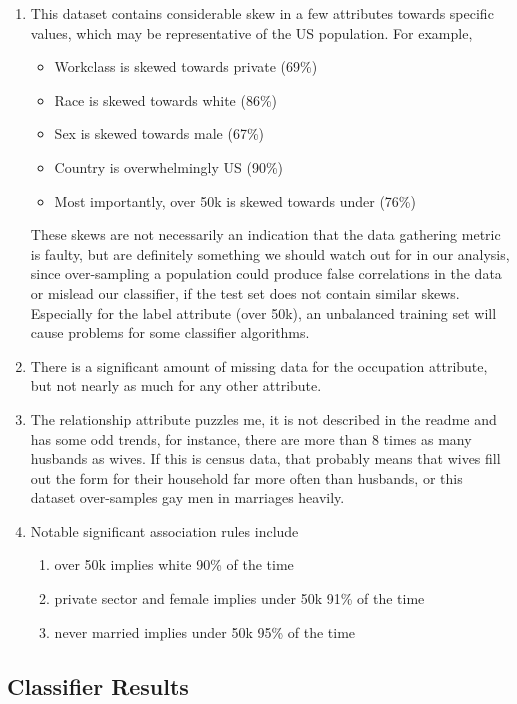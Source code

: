 \documentclass[twoside,12pt]{article}
\begin{document}
\begin{enumerate}
\item This dataset contains considerable skew in a few attributes towards specific values, which may be representative of the US population. For example, 
\begin{itemize}
\item Workclass is skewed towards private (69\%)
\item Race is skewed towards white (86\%)
\item Sex is skewed towards male (67\%)
\item Country is overwhelmingly US (90\%)
\item Most importantly, over 50k is skewed towards under (76\%)
\end{itemize}
These skews are not necessarily an indication that the data gathering metric is faulty, but are definitely something we should watch out for in our analysis, since over-sampling a population could produce false correlations in the data or mislead our classifier, if the test set does not contain similar skews. Especially for the label attribute (over 50k), an unbalanced training set will cause problems for some classifier algorithms.
\item There is a significant amount of missing data for the occupation attribute, but not nearly as much for any other attribute.
\item The relationship attribute puzzles me, it is not described in the readme and has some odd trends, for instance, there are more than 8 times as many husbands as wives. If this is census data, that probably means that wives fill out the form for their household far more often than husbands, or this dataset over-samples gay men in marriages heavily.
\item Notable significant association rules include 
\begin{enumerate}
\item over 50k implies white 90\% of the time
\item private sector and female implies under 50k 91\% of the time
\item never married implies under 50k 95\% of the time
\end{enumerate}
\end{enumerate}

\subsection*{Classifier Results}
\end{document}
